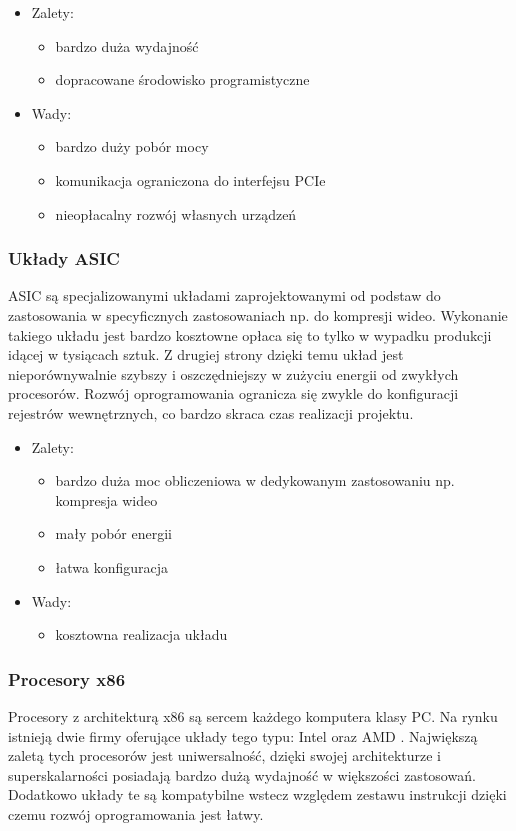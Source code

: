 \begin{itemize}
\item Zalety:
\begin{itemize}
\item bardzo duża wydajność
\item dopracowane środowisko programistyczne 
\end{itemize}

\item Wady:
\begin{itemize}
\item bardzo duży pobór mocy
\item komunikacja ograniczona do interfejsu PCIe
\item nieopłacalny rozwój własnych urządzeń
\end{itemize}
\end{itemize}

\subsubsection{Układy ASIC}
ASIC są specjalizowanymi układami zaprojektowanymi od podstaw do zastosowania w specyficznych zastosowaniach np. do kompresji wideo. Wykonanie takiego układu jest bardzo kosztowne opłaca się to tylko w wypadku produkcji idącej w tysiącach sztuk. Z drugiej strony dzięki temu układ jest nieporównywalnie szybszy i oszczędniejszy w zużyciu energii od zwykłych procesorów. Rozwój oprogramowania ogranicza się zwykle do konfiguracji rejestrów wewnętrznych, co bardzo skraca czas realizacji projektu. 


\begin{itemize}
\item Zalety:
\begin{itemize}
\item bardzo duża moc obliczeniowa w dedykowanym zastosowaniu np. kompresja wideo
\item mały pobór energii
\item łatwa konfiguracja
\end{itemize}

\item Wady:
\begin{itemize}
\item kosztowna realizacja układu
\end{itemize}

\end{itemize}

\subsubsection{Procesory x86}
Procesory z architekturą x86 są sercem każdego komputera klasy PC. Na rynku istnieją dwie firmy oferujące układy tego typu: Intel \cite{Intel} oraz AMD \cite{AMD}. Największą zaletą tych procesorów jest uniwersalność, dzięki swojej architekturze i superskalarności posiadają bardzo dużą wydajność w większości zastosowań. Dodatkowo układy te są kompatybilne wstecz względem zestawu instrukcji dzięki czemu rozwój oprogramowania jest  łatwy.

